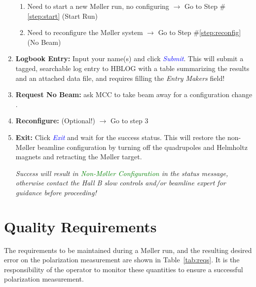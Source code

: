 \documentclass[amsmath,amssymb,notitlepage,12pt]{revtex4}
\begin{document}
\begin{enumerate}
\begin{enumerate}
            \item Need to start a new M{\o}ller run, no configuring $\to$ Go to Step \#\ref{step:start} (Start Run)
            \item Need to reconfigure the M{\o}ller system $\to$ Go to Step \#\ref{step:reconfig} (No Beam)
        \end{enumerate}
    \item {\bf Logbook Entry:} Input your name(s) and click \textcolor{blue}{\em Submit}\label{step:log}.
        This will submit a tagged, searchable log entry to HBLOG with a table summarizing the results and an attached data file, and requires filling the {\em Entry Makers} field!
    \item {\bf Request No Beam:} ask MCC to take beam away for a configuration change \label{step:reconfig}.
    \item {\bf Reconfigure:} (Optional!) $\to$ Go to step 3
    \item {\bf Exit:} Click \textcolor{blue}{\em Exit} and wait for the success status.  
        This will restore the non-M{\o}ller beamline configuration by turning off the quadrupoles and Helmholtz magnets and retracting the M{\o}ller target.  
        \begin{adjustwidth}{1cm}{1cm}
            {\em Success will result in \textcolor{green}{\em Non-M{\o}ller Configuration} in the status message, otherwise contact the Hall B slow controls and/or beamline expert for guidance before proceeding!}
        \end{adjustwidth}
\end{enumerate}


\section{Quality Requirements}\label{sec:quality}

The requirements to be maintained during a M{\o}ller run, and the resulting desired error on the polarization measurement are shown in Table~\ref{tab:reqs}.  It is the responsibility of the operator to monitor these quantities to ensure a successful polarization measurement.
\end{document}
